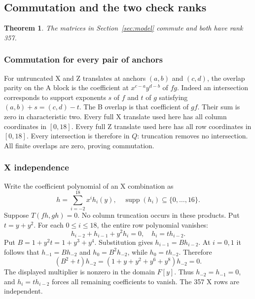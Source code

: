 \documentclass{article}
\newtheorem{theorem}{Theorem}
\DeclareMathOperator{\supp}{supp}
\begin{document}
\subsection{Commutation and the two check ranks}\label{app:ranks}

\begin{theorem}\label{thm:ranks}
  The matrices in Section~\ref{sec:model} commute and both have rank 357.
\end{theorem}

\subsubsection{Commutation for every pair of anchors}\label{app:commutation}

For untruncated X and Z translates at anchors \((a,b)\) and \((c,d)\),
the overlap parity on the A block is the coefficient at
\(x^{c-a} y^{d-b}\) of \(fg\). Indeed an intersection corresponds to support
exponents \(s\) of \(f\) and \(t\) of \(g\) satisfying
\((a,b) + s = (c,d) - t\). The B overlap is that coefficient of \(gf\).
Their sum is zero in characteristic two.
Every full X translate used here has all column coordinates in \([0,18]\).
Every full Z translate used here has all row coordinates in \([0,18]\).
Every intersection is therefore in \(Q\): truncation removes no
intersection. All finite overlaps are zero, proving commutation.

\subsubsection{X independence}\label{app:x-independence}

Write the coefficient polynomial of an X combination as
\begin{equation}
  h = \sum_{i=-2}^{18} x^i h_i(y), \quad \supp(h_i) \subseteq \{0, \dots, 16\}.
\end{equation}
Suppose \(T(fh, gh) = 0\). No column truncation occurs in these products.
Put \(t = y + y^2\). For each \(0 \le i \le 18\), the entire row polynomial vanishes:
\begin{equation}
  h_{i-2} + h_{i-1} + y^2 h_i = 0, \quad h_i = t h_{i-2}.
\end{equation}
Put \(B = 1 + y^2 t = 1 + y^3 + y^4\). Substitution gives
\(h_{i-1} = B h_{i-2}\). At \(i = 0, 1\) it follows that
\(h_{-1} = B h_{-2}\) and \(h_0 = B^2 h_{-2}\), while
\(h_0 = t h_{-2}\). Therefore
\begin{equation}
  (B^2 + t) h_{-2} = (1 + y + y^2 + y^6 + y^8) h_{-2} = 0.
\end{equation}
The displayed multiplier is nonzero in the domain \(F[y]\).
Thus \(h_{-2} = h_{-1} = 0\), and \(h_i = t h_{i-2}\) forces all remaining
coefficients to vanish. The 357 X rows are independent.
\end{document}
